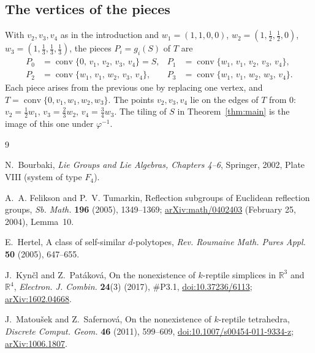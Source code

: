 \documentclass[11pt]{article}
\theoremstyle{remark}
\begin{document}
\begin{appendices}
\section{The vertices of the pieces}\label{app:vertices}

With $v_2,v_3,v_4$ as in the introduction and $w_1=(1,1,0,0)$,
$w_2=(1,\tfrac12,\tfrac12,0)$, $w_3=(1,\tfrac13,\tfrac13,\tfrac13)$, the
pieces $P_i=g_i(S)$ of $T$ are
\begin{align*}
P_0&=\operatorname{conv}\{0,\,v_1,\,v_2,\,v_3,\,v_4\}=S, &
P_1&=\operatorname{conv}\{w_1,\,v_1,\,v_2,\,v_3,\,v_4\},\\
P_2&=\operatorname{conv}\{w_1,\,v_1,\,w_2,\,v_3,\,v_4\}, &
P_3&=\operatorname{conv}\{w_1,\,v_1,\,w_2,\,w_3,\,v_4\}.
\end{align*}
Each piece arises from the previous one by replacing one vertex, and
$T=\operatorname{conv}\{0,v_1,w_1,w_2,w_3\}$. The points $v_2,v_3,v_4$
lie on the edges of $T$ from $0$: $v_2=\frac12w_1$, $v_3=\frac23w_2$,
$v_4=\frac34w_3$. The tiling of $S$ in Theorem~\ref{thm:main} is the
image of this one under $\varphi^{-1}$.

\end{appendices}

\begin{thebibliography}{9}

N.~Bourbaki, \emph{Lie Groups and Lie Algebras, Chapters 4--6},
Springer, 2002, Plate VIII (system of type $F_4$).

A.~A. Felikson and P.~V. Tumarkin, Reflection subgroups of Euclidean
reflection groups, \emph{Sb. Math.} \textbf{196} (2005), 1349--1369;
\href{https://arxiv.org/abs/math/0402403}{arXiv:math/0402403} (February
25, 2004), Lemma~10.

E.~Hertel, A class of self-similar $d$-polytopes, \emph{Rev. Roumaine
Math. Pures Appl.} \textbf{50} (2005), 647--655.

J.~Kynčl and Z.~Patáková, On the nonexistence of $k$-reptile simplices
in $\mathbb{R}^3$ and $\mathbb{R}^4$, \emph{Electron. J. Combin.}
\textbf{24}(3) (2017), \#P3.1,
\href{https://doi.org/10.37236/6113}{doi:10.37236/6113};
\href{https://arxiv.org/abs/1602.04668}{arXiv:1602.04668}.

J.~Matoušek and Z.~Safernová, On the nonexistence of $k$-reptile
tetrahedra, \emph{Discrete Comput. Geom.} \textbf{46} (2011), 599--609,
\href{https://doi.org/10.1007/s00454-011-9334-z}{doi:10.1007/s00454-011-9334-z};
\href{https://arxiv.org/abs/1006.1807}{arXiv:1006.1807}.

\end{thebibliography}
\end{document}
